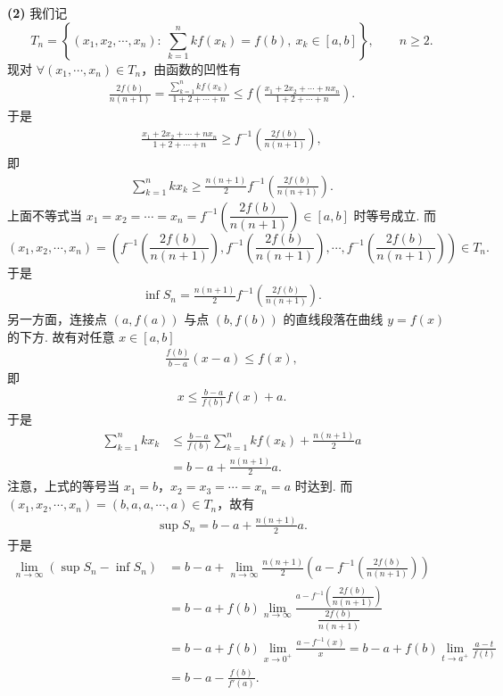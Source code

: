 \begin{solution}
\textbf{(2)} 我们记
\[
  T_n=\left\{(x_1,x_2,\cdots,x_n):\ \sum_{k=1}^{n}kf(x_k)=f(b),\ x_k\in[a,b]\right\},\qquad n\ge 2.
\]
现对 $\forall(x_1,\cdots,x_n)\in T_n$，由函数的凹性有
\begin{align*}
\frac{2f(b)}{n(n+1)}=\frac{\sum\limits_{k=1}^{n}kf(x_k)}{1+2+\cdots+n}\le f\left(\frac{x_1+2x_2+\cdots+nx_n}{1+2+\cdots+n}\right).
\end{align*}
于是
\begin{align*}
\frac{x_1+2x_2+\cdots+nx_n}{1+2+\cdots+n}\ge f^{-1}\left(\frac{2f(b)}{n(n+1)}\right),
\end{align*}
即
\begin{align*}
\sum_{k=1}^{n}kx_k\ge\frac{n(n+1)}{2}f^{-1}\left(\frac{2f(b)}{n(n+1)}\right).
\end{align*}
上面不等式当 $x_1=x_2=\cdots=x_n=f^{-1}\left(\dfrac{2f(b)}{n(n+1)}\right)\in[a,b]$ 时等号成立. 而
\[
  (x_1,x_2,\cdots,x_n)=\left(f^{-1}\left(\frac{2f(b)}{n(n+1)}\right),f^{-1}\left(\frac{2f(b)}{n(n+1)}\right),\cdots,f^{-1}\left(\frac{2f(b)}{n(n+1)}\right)\right)\in T_n.
\]
于是
\begin{align*}
\inf S_n=\frac{n(n+1)}{2}f^{-1}\left(\frac{2f(b)}{n(n+1)}\right).
\end{align*}
另一方面，连接点 $(a,f(a))$ 与点 $(b,f(b))$ 的直线段落在曲线 $y=f(x)$ 的下方. 故有对任意 $x\in[a,b]$
\begin{align*}
\frac{f(b)}{b-a}(x-a)\le f(x),
\end{align*}
即
\begin{align*}
x\le\frac{b-a}{f(b)}f(x)+a.
\end{align*}
于是
\begin{align*}
\sum_{k=1}^{n}kx_k&\le\frac{b-a}{f(b)}\sum_{k=1}^{n}kf(x_k)+\frac{n(n+1)}{2}a\\
&=b-a+\frac{n(n+1)}{2}a.
\end{align*}
注意，上式的等号当 $x_1=b$，$x_2=x_3=\cdots=x_n=a$ 时达到. 而 $(x_1,x_2,\cdots,x_n)=(b,a,a,\cdots,a)\in T_n$，故有
\begin{align*}
\sup S_n=b-a+\frac{n(n+1)}{2}a.
\end{align*}
于是
\begin{align*}
\lim_{n\to\infty}(\sup S_n-\inf S_n)&=b-a+\lim_{n\to\infty}\frac{n(n+1)}{2}\left(a-f^{-1}\left(\frac{2f(b)}{n(n+1)}\right)\right)\\
&=b-a+f(b)\lim_{n\to\infty}\frac{a-f^{-1}\left(\dfrac{2f(b)}{n(n+1)}\right)}{\dfrac{2f(b)}{n(n+1)}}\\
&=b-a+f(b)\lim_{x\to0^+}\frac{a-f^{-1}(x)}{x}=b-a+f(b)\lim_{t\to a^+}\frac{a-t}{f(t)}\\
&=b-a-\frac{f(b)}{f'(a)}.
\end{align*}
\end{solution}

